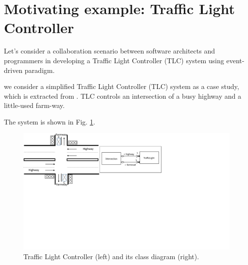 \section{Motivating example: Traffic Light Controller}
\label{sec:motivation}
Let's consider a collaboration scenario between software architects and programmers in developing a Traffic Light Controller (TLC) system using event-driven paradigm. 

we consider a simplified Traffic Light Controller (TLC) system as a case study, which is extracted from \cite{katz2005contemporary}.
TLC controls an intersection of a busy highway and a little-used farm-way.

The system is shown in Fig. \ref{fig:casestudy}.

\begin{figure}
	\centering
	\includegraphics[clip, trim=0.6cm 10.4cm 10.9cm 0cm, width=1.0\columnwidth]{figures/casestudy}
	\caption{Traffic Light Controller (left) and its class diagram (right).} 
	\label{fig:casestudy}
\end{figure}



